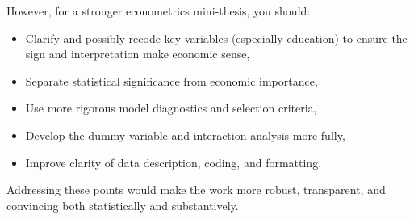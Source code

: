 \documentclass[
  letterpaper,
  DIV=11,
  numbers=noendperiod]{scrartcl}
\providecommand{\tightlist}{%
  \setlength{\itemsep}{0pt}\setlength{\parskip}{0pt}}
\begin{document}
However, for a stronger econometrics mini‑thesis, you should:

\begin{itemize}
\tightlist
\item
  Clarify and possibly recode key variables (especially education) to
  ensure the sign and interpretation make economic sense,\\
\item
  Separate statistical significance from economic importance,\\
\item
  Use more rigorous model diagnostics and selection criteria,\\
\item
  Develop the dummy-variable and interaction analysis more fully,\\
\item
  Improve clarity of data description, coding, and formatting.
\end{itemize}

Addressing these points would make the work more robust, transparent,
and convincing both statistically and substantively.
\end{document}

